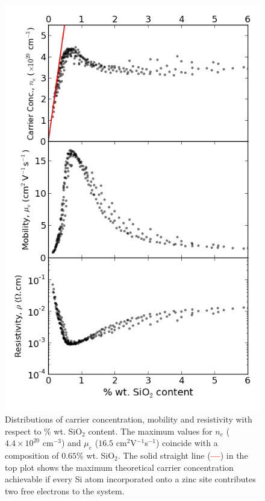 \documentclass[final,5p,times]{elsarticle}
\begin{document}
\begin{figure}[t!]
\centering
\includegraphics[width = 1.0\columnwidth]{figure_6.png}
\caption{\label{fig:6} Distributions of carrier concentration, mobility and resistivity with respect to \% wt. SiO$_{2}$ content. The maximum values for $n_e$ ($4.4\times10^{20}$ cm$^{-3}$) and $\mu_{e}$ ($16.5$ cm$^{2}$V$^{-1}$s$^{-1}$) coincide with a composition of $0.65$\% wt. SiO$_{2}$. The solid straight line (\textcolor{red}{\textbf{---}}) in the top plot shows the maximum theoretical carrier concentration achievable if every Si atom incorporated onto a zinc site contributes two free electrons to the system.}
\end{figure}
\end{document}

